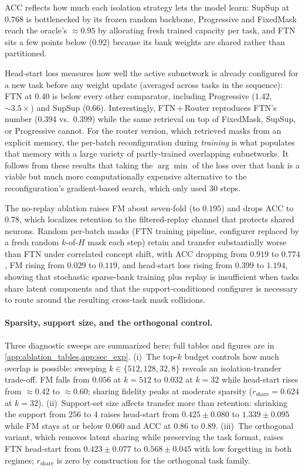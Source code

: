 \documentclass{article}
\begin{document}
ACC reflects how much each isolation strategy lets the model learn: SupSup at $0.768$ is bottlenecked by its frozen random backbone, Progressive and FixedMask reach the oracle's $\approx 0.95$ by allocating fresh trained capacity per task, and FTN sits a few points below ($0.92$) because its bank weights are shared rather than partitioned. 

Head-start loss measures how well the active subnetwork is already configured for a new task before any weight update (averaged across tasks in the sequence): FTN at $0.40$ is below every other comparator, including Progressive ($1.42$, ${\sim}3.5\times$) and SupSup ($0.66$). 
Interestingly, FTN\,+\,Router reproduces FTN's number ($0.394$ vs.\ $0.399$) while the same retrieval on top of FixedMask, SupSup, or Progressive cannot.
For the router version, which retrieved masks from an explicit memory, the per-batch reconfiguration during \emph{training} is what populates that memory with a large variety of partly-trained overlapping subnetworks. It follows from these results that taking the $\arg\min$ of the loss over that bank is a viable but much more computationally expensive alternative to the reconfiguration's gradient-based search, which only used 30 steps.

The no-replay ablation raises FM about seven-fold (to $0.195$) and drops ACC to $0.78$, which localizes retention to the filtered-replay channel that protects shared neurons. Random per-batch masks (FTN training pipeline, configurer replaced by a fresh random $k$-of-$H$ mask each step) retain and transfer substantially worse than FTN under correlated concept shift, with ACC dropping from $0.919$ to $0.774$, FM rising from $0.029$ to $0.119$, and head-start loss rising from $0.399$ to $1.194$, showing that stochastic sparse-bank training plus replay is insufficient when tasks share latent components and that the support-conditioned configurer is necessary to route around the resulting cross-task mask collisions.



\paragraph{Sparsity, support size, and the orthogonal control.}
Three diagnostic sweeps are summarized here; full tables and figures are in \cref{app:ablation_tables,app:sec_exp}. (i)~The top-$k$ budget controls how much overlap is possible: sweeping $k\in\{512,128,32,8\}$ reveals an isolation-transfer trade-off. FM falls from $0.056$ at $k{=}512$ to $0.032$ at $k{=}32$ while head-start rises from ${\approx}0.42$ to ${\approx}0.60$; sharing fidelity peaks at moderate sparsity ($r_{\mathrm{share}}{=}0.624$ at $k{=}32$). (ii)~Support-set size affects transfer more than retention: shrinking the support from $256$ to $4$ raises head-start from $0.425{\pm}0.080$ to $1.339{\pm}0.095$ while FM stays at or below $0.060$ and ACC at $0.86$ to $0.89$. (iii)~The orthogonal variant, which removes latent sharing while preserving the task format, raises FTN head-start from $0.423{\pm}0.077$ to $0.568{\pm}0.045$ with low forgetting in both regimes; $r_{\mathrm{share}}$ is zero by construction for the orthogonal task family.
\end{document}
